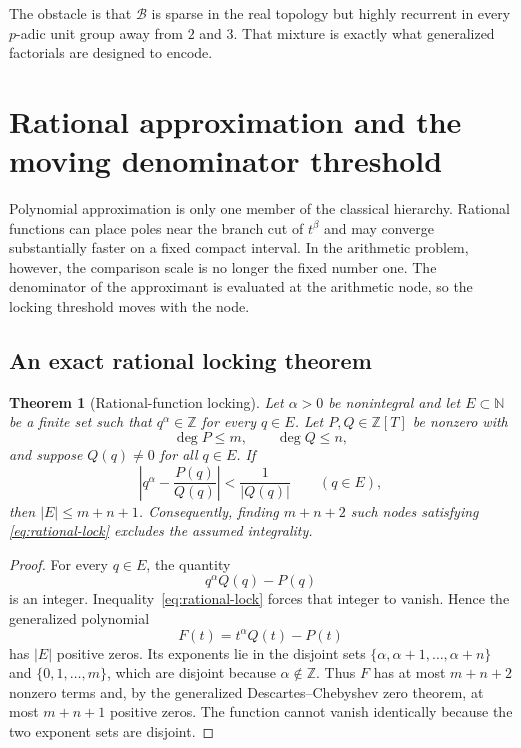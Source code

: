 \documentclass[11pt,oneside]{article}
\newtheorem{theorem}{Theorem}[section]
\theoremstyle{definition}
\theoremstyle{remark}
\newcommand{\N}{\mathbb N}
\newcommand{\Z}{\mathbb Z}
\newcommand{\Bsem}{\mathcal B}
\begin{document}
The obstacle is that $\Bsem$ is sparse in the real topology but highly recurrent in every
$p$-adic unit group away from $2$ and $3$.  That mixture is exactly what generalized
factorials are designed to encode.

\section{Rational approximation and the moving denominator threshold}
\label{sec:rational}

Polynomial approximation is only one member of the classical hierarchy.  Rational functions
can place poles near the branch cut of $t^\beta$ and may converge substantially faster on a
fixed compact interval.  In the arithmetic problem, however, the comparison scale is no
longer the fixed number one.  The denominator of the approximant is evaluated at the
arithmetic node, so the locking threshold moves with the node.

\subsection{An exact rational locking theorem}

\begin{theorem}[Rational-function locking]
\label{thm:rational-locking}
Let $\alpha>0$ be nonintegral and let $E\subset\N$ be a finite set such that
$q^\alpha\in\Z$ for every $q\in E$.  Let $P,Q\in\Z[T]$ be nonzero with
\[
 \deg P\le m,\qquad \deg Q\le n,
\]
and suppose $Q(q)\ne0$ for all $q\in E$.  If
\begin{equation}
 \left|q^\alpha-\frac{P(q)}{Q(q)}\right|<\frac1{|Q(q)|}
 \qquad(q\in E),
 \label{eq:rational-lock}
\end{equation}
then $|E|\le m+n+1$.  Consequently, finding $m+n+2$ such nodes satisfying
\eqref{eq:rational-lock} excludes the assumed integrality.
\end{theorem}

\begin{proof}
For every $q\in E$, the quantity
\[
 q^\alpha Q(q)-P(q)
\]
is an integer.  Inequality~\eqref{eq:rational-lock} forces that integer to vanish.  Hence the
generalized polynomial
\[
 F(t)=t^\alpha Q(t)-P(t)
\]
has $|E|$ positive zeros.  Its exponents lie in the disjoint sets
$\{\alpha,\alpha+1,\ldots,\alpha+n\}$ and $\{0,1,\ldots,m\}$, which are disjoint because
$\alpha\notin\Z$.  Thus $F$ has at most $m+n+2$ nonzero terms and, by the generalized
Descartes--Chebyshev zero theorem, at most $m+n+1$ positive zeros.  The function cannot vanish
identically because the two exponent sets are disjoint.
\end{proof}
\end{document}
